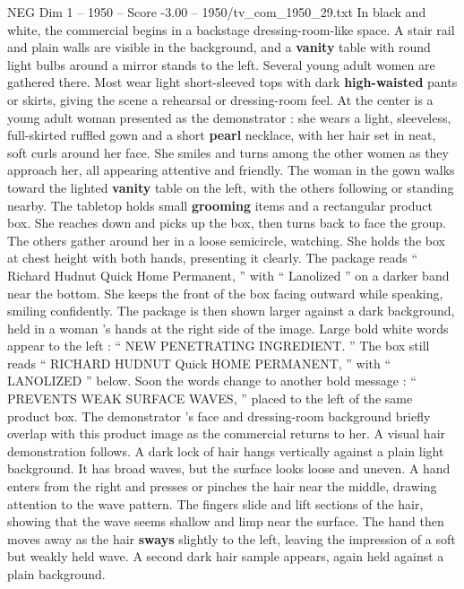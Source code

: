 \begin{textsample}{NEG Dim 1 – 1950 – Score -3.00 – 1950/tv\_com\_1950\_29.txt}  \label{ex:f1_neg_010}
In black and white, the commercial begins in a backstage dressing-room-like space.
A stair rail and plain walls are visible in the background, and a \textbf{vanity} table with round light bulbs around a mirror stands to the left.
Several young adult women are gathered there.
Most wear light short-sleeved tops with dark \textbf{high-waisted} pants or skirts, giving the scene a rehearsal or dressing-room feel.
At the center is a young adult woman presented as the demonstrator : she wears a light, sleeveless, full-skirted ruffled gown and a short \textbf{pearl} necklace, with her hair set in neat, soft curls around her face.
She smiles and turns among the other women as they approach her, all appearing attentive and friendly.
The woman in the gown walks toward the lighted \textbf{vanity} table on the left, with the others following or standing nearby.
The tabletop holds small \textbf{grooming} items and a rectangular product box.
She reaches down and picks up the box, then turns back to face the group.
The others gather around her in a loose semicircle, watching.
She holds the box at chest height with both hands, presenting it clearly.
The package reads “ Richard Hudnut Quick Home Permanent, ” with “ Lanolized ” on a darker band near the bottom.
She keeps the front of the box facing outward while speaking, smiling confidently.
The package is then shown larger against a dark background, held in a woman ’s hands at the right side of the image.
Large bold white words appear to the left : “ NEW PENETRATING INGREDIENT. ” The box still reads “ RICHARD HUDNUT Quick HOME PERMANENT, ” with “ LANOLIZED ” below.
Soon the words change to another bold message : “ PREVENTS WEAK SURFACE WAVES, ” placed to the left of the same product box.
The demonstrator ’s face and dressing-room background briefly overlap with this product image as the commercial returns to her.
A visual hair demonstration follows.
A dark lock of hair hangs vertically against a plain light background.
It has broad waves, but the surface looks loose and uneven.
A hand enters from the right and presses or pinches the hair near the middle, drawing attention to the wave pattern.
The fingers slide and lift sections of the hair, showing that the wave seems shallow and limp near the surface.
The hand then moves away as the hair \textbf{sways} slightly to the left, leaving the impression of a soft but weakly held wave.
A second dark hair sample appears, again held against a plain background.

\end{textsample}
